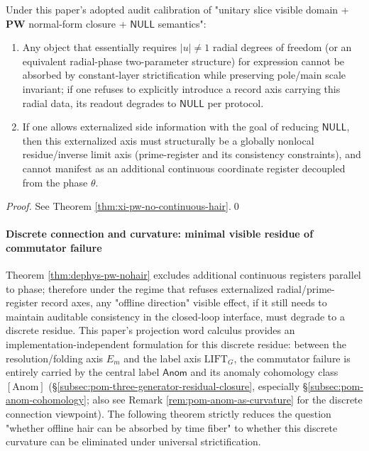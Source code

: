 \begin{theorem}\label{thm:dephys-pw-nohair}
Under this paper's adopted audit calibration of "unitary slice visible domain + \(\mathbf{PW}\) normal-form closure + \(\mathsf{NULL}\) semantics":
\begin{enumerate}
  \item Any object that essentially requires \(|u|\neq 1\) radial degrees of freedom (or an equivalent radial-phase two-parameter structure) for expression cannot be absorbed by constant-layer strictification while preserving pole/main scale invariant; if one refuses to explicitly introduce a record axis carrying this radial data, its readout degrades to \(\mathsf{NULL}\) per protocol.
  \item If one allows externalized side information with the goal of reducing \(\mathsf{NULL}\), then this externalized axis must structurally be a globally nonlocal residue/inverse limit axis (prime-register and its consistency constraints), and cannot manifest as an additional continuous coordinate register decoupled from the phase \(\theta\).
\end{enumerate}
\end{theorem}

\begin{proof}
See Theorem \ref{thm:xi-pw-no-continuous-hair}.\qed
\end{proof}



\paragraph{Discrete connection and curvature: minimal visible residue of commutator failure}
Theorem \ref{thm:dephys-pw-nohair} excludes additional continuous registers parallel to phase; therefore under the regime that refuses externalized radial/prime-register record axes, any "offline direction" visible effect, if it still needs to maintain auditable consistency in the closed-loop interface, must degrade to a discrete residue.
This paper's projection word calculus provides an implementation-independent formulation for this discrete residue: between the resolution/folding axis \(E_m\) and the label axis \(\mathrm{LIFT}_G\), the commutator failure is entirely carried by the central label \(\mathsf{Anom}\) and its anomaly cohomology class \([\mathrm{Anom}]\) (\S\ref{subsec:pom-three-generator-residual-closure}, especially \S\ref{subsec:pom-anom-cohomology}; also see Remark \ref{rem:pom-anom-as-curvature} for the discrete connection viewpoint).
The following theorem strictly reduces the question "whether offline hair can be absorbed by time fiber" to whether this discrete curvature can be eliminated under universal strictification.

